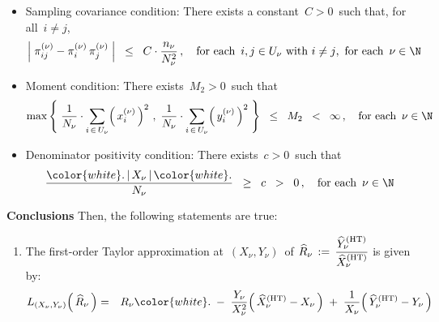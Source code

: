 \begin{theorem}
\begin{itemize}
\begin{equation*}
    \quad
    \textnormal{for each \,$i \in U_{\nu}$,\; and for each \,$\nu \in \N$}
    \end{equation*}
\item
    Sampling covariance condition:
    There exists a constant \,$C > 0$\, such that,
    for all \,$i \neq j$,\,
    \begin{equation*}
    \left\vert\; \pi^{(\nu)}_{ij} - \pi^{(\nu)}_{i}\,\pi^{(\nu)}_{j} \;\right\vert
    \;\; \leq \;\;
        C\cdot\dfrac{n_{\nu}}{N_{\nu}^{2}}\,,
    \quad
    \textnormal{for each \,$i,j \in U_{\nu}$ with $i \neq j$,\, for each \,$\nu\in\N$}
    \end{equation*}
\item
    Moment condition:\;
    There exists \,$M_{2} > 0$\, such that
    \begin{equation*}
    \max\left\{\;
        \dfrac{1}{N_{\nu}}\cdot\underset{i\,\in\,U_{\nu}}{\sum}\!\left(\,x^{(\nu)}_{i}\,\right)^{2}
        \,,\;
        \dfrac{1}{N_{\nu}}\cdot\underset{i\,\in\,U_{\nu}}{\sum}\!\left(\,y^{(\nu)}_{i}\,\right)^{2}
        \;\right\}
    \;\; \leq \;\;M_{2} \;\; < \;\; \infty\,,
    \quad
    \textnormal{for each \,$\nu\in\N$}
    \end{equation*}
\item
    Denominator positivity condition:\;
    There exists \,$c > 0$\, such that
    \begin{equation*}
    \dfrac{
        {\color{white}.}
        \left\vert\,X_{\nu}\,\right\vert
        {\color{white}.}
        }{
        N_{\nu}
        }
    \;\; \geq \;\; c \;\; > \;\; 0\,,
    \quad
    \textnormal{for each \,$\nu\in\N$}
    \end{equation*}
\end{itemize}
\vskip 0.2cm
\noindent
\textbf{Conclusions}
\vskip 0.1cm
\noindent
Then, the following statements are true:
\begin{enumerate}
\item
    The first-order Taylor approximation at
    \,$(X_{\nu},Y_{\nu})$\,
    of
    \;$
    \widehat{R}_{\nu}
    \, := \,
        \dfrac{
            \widehat{Y}^{\textnormal{(HT)}}_{\nu}
            }{
            \widehat{X}^{\textnormal{(HT)}}_{\nu}
            }
    $\;
    is given by:
    \begin{eqnarray*}
    L_{(X_{\nu},Y_{\nu})}\!\left(\,\widehat{R}_{\nu}\,\right)
    & = &
        R_{\nu}
        {\color{white}.}
        \; - \;
        \dfrac{Y_{\nu}}{X_{\nu}^{2}}\!\left(\,\widehat{X}^{\textnormal{(HT)}}_{\nu} - X_{\nu} \,\right)
        \; + \;
        \dfrac{1}{X_{\nu}}\!\left(\,\widehat{Y}^{\textnormal{(HT)}}_{\nu} - Y_{\nu} \,\right)

\end{eqnarray*}
\end{enumerate}
\end{theorem}
